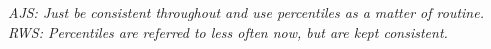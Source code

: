 \documentclass{ametsoc}
\begin{document}



\emph{AJS: Just be consistent throughout and use percentiles as a matter of routine. RWS: Percentiles are referred to less often now, but are kept consistent.}
\end{document}
